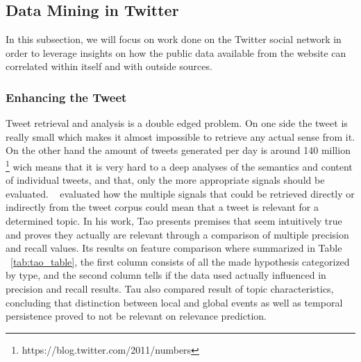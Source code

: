 
\subsection{Data Mining in Twitter } %
\label{sub:data_mining_in_twitter_}
In this subsection, we will focus on work done on the Twitter social network in order to leverage insights on how the public data available from the website can correlated within itself and with outside sources. 

\subsubsection{Enhancing the Tweet} %
\label{ssub:the_tweet}
Tweet retrieval and analysis is a double edged problem. On one side the tweet is really small which makes it almost impossible to retrieve any actual sense from it. On the other hand the amount of tweets generated per day is around 140 million \footnote{https://blog.twitter.com/2011/numbers} wich means that it is very hard to a deep analyses of the semantics and content of individual tweets, and that, only the more appropriate signals should be evaluated.
~\citet{Tao2012} evaluated how the multiple signals that could be retrieved directly or indirectly from the tweet corpus could mean that a tweet is relevant for a determined topic. In his work, Tao presents premises that seem intuitively true and proves they actually are relevant through a comparison of multiple precision and recall values. Its results on feature comparison where summarized in Table ~\ref{tab:tao_table}, the first column consists of all the made hypothesis categorized by type, and the second column tells if the data used actually influenced in precision and recall results. Tau also compared result of topic characteristics, concluding that distinction between local and global events as well as temporal persistence proved to not be relevant on relevance prediction.

